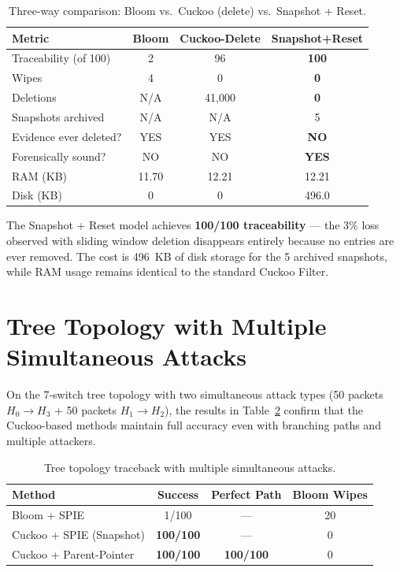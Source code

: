 \documentclass[12pt, a4paper]{report}
\begin{document}
\begin{table}[H]
\centering
\caption{Three-way comparison: Bloom vs.\ Cuckoo (delete) vs.\
Snapshot + Reset.}
\label{tab:three-way}
\begin{tabular}{lccc}
\toprule
\textbf{Metric} & \textbf{Bloom} & \textbf{Cuckoo-Delete}
                & \textbf{Snapshot+Reset} \\
\midrule
Traceability (of 100)       & 2        & 96       & \textbf{100} \\
Wipes                       & 4        & 0        & \textbf{0}   \\
Deletions                   & N/A      & 41{,}000 & \textbf{0}   \\
Snapshots archived          & N/A      & N/A      & 5            \\
Evidence ever deleted?      & YES      & YES      & \textbf{NO}  \\
Forensically sound?         & NO       & NO       & \textbf{YES} \\
RAM (KB)                    & 11.70    & 12.21    & 12.21        \\
Disk (KB)                   & 0        & 0        & 496.0        \\
\bottomrule
\end{tabular}
\end{table}

The Snapshot + Reset model achieves \textbf{100/100 traceability} ---
the 3\% loss observed with sliding window deletion disappears entirely
because no entries are ever removed. The cost is 496~KB of disk storage
for the 5 archived snapshots, while RAM usage remains identical to the
standard Cuckoo Filter.

\section{Tree Topology with Multiple Simultaneous Attacks}
\label{sec:tree-results}

On the 7-switch tree topology with two simultaneous attack types (50
packets $H_0\!\to\!H_3$ + 50 packets $H_1\!\to\!H_2$), the results in
Table~\ref{tab:tree-trace} confirm that the Cuckoo-based methods
maintain full accuracy even with branching paths and multiple attackers.

\begin{table}[H]
\centering
\caption{Tree topology traceback with multiple simultaneous attacks.}
\label{tab:tree-trace}
\begin{tabular}{lccc}
\toprule
\textbf{Method} & \textbf{Success} & \textbf{Perfect Path}
                & \textbf{Bloom Wipes} \\
\midrule
Bloom + SPIE                   & 1/100    & ---      & 20 \\
Cuckoo + SPIE (Snapshot)       & \textbf{100/100} & ---      & 0  \\
Cuckoo + Parent-Pointer        & \textbf{100/100} & \textbf{100/100} & 0  \\
\bottomrule
\end{tabular}
\end{table}
\end{document}
